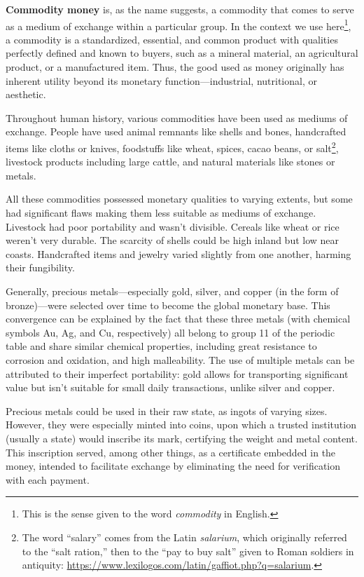 \documentclass[
  a5paper,
  smalldemyvopaper,10pt,twoside,onecolumn,openright,extrafontsizes,hidelinks]{memoir}
\begin{document}
\textbf{Commodity money} is, as the name suggests, a commodity that
comes to serve as a medium of exchange within a particular group. In the
context we use here\footnote{This is the sense given to the word
  \emph{commodity} in English.}, a commodity is a standardized,
essential, and common product with qualities perfectly defined and known
to buyers, such as a mineral material, an agricultural product, or a
manufactured item. Thus, the good used as money originally has inherent
utility beyond its monetary function---industrial, nutritional, or
aesthetic.

Throughout human history, various commodities have been used as mediums
of exchange. People have used animal remnants like shells and bones,
handcrafted items like cloths or knives, foodstuffs like wheat, spices,
cacao beans, or salt\footnote{The word ``salary'' comes from the Latin
  \emph{salarium}, which originally referred to the ``salt ration,''
  then to the ``pay to buy salt'' given to Roman soldiers in antiquity:
  \url{https://www.lexilogos.com/latin/gaffiot.php?q=salarium}.},
livestock products including large cattle, and natural materials like
stones or metals.

All these commodities possessed monetary qualities to varying extents,
but some had significant flaws making them less suitable as mediums of
exchange. Livestock had poor portability and wasn't divisible. Cereals
like wheat or rice weren't very durable. The scarcity of shells could be
high inland but low near coasts. Handcrafted items and jewelry varied
slightly from one another, harming their fungibility.

Generally, precious metals---especially gold, silver, and copper (in the
form of bronze)---were selected over time to become the global monetary
base. This convergence can be explained by the fact that these three
metals (with chemical symbols Au, Ag, and Cu, respectively) all belong
to group 11 of the periodic table and share similar chemical properties,
including great resistance to corrosion and oxidation, and high
malleability. The use of multiple metals can be attributed to their
imperfect portability: gold allows for transporting significant value
but isn't suitable for small daily transactions, unlike silver and
copper.

Precious metals could be used in their raw state, as ingots of varying
sizes. However, they were especially minted into coins, upon which a
trusted institution (usually a state) would inscribe its mark,
certifying the weight and metal content. This inscription served, among
other things, as a certificate embedded in the money, intended to
facilitate exchange by eliminating the need for verification with each
payment.
\end{document}
